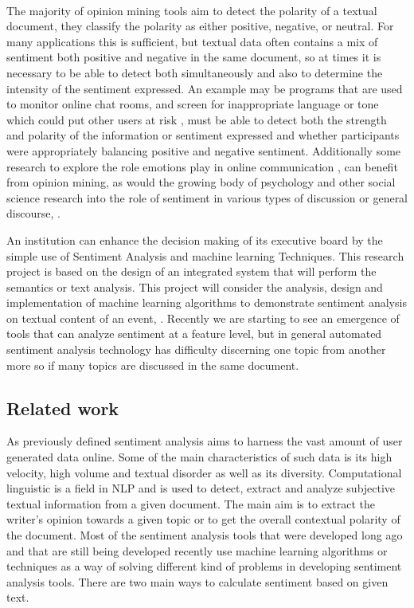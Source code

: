 \leavevmode\\
The majority of opinion mining tools aim to detect the polarity of a textual document, they classify the polarity as either positive, negative, or neutral. For many applications this is sufficient, but textual data often contains a mix of sentiment both positive and negative in the same document, so at times it is necessary to be able to detect both simultaneously and also to determine the intensity of the sentiment expressed. An example may be programs that are used to monitor online chat rooms, and screen for inappropriate language or tone which could put other users at risk \cite{ref16}, must be able to detect both the strength and polarity of the information or sentiment expressed and whether participants were appropriately balancing positive and negative sentiment. Additionally some research to explore the role emotions play in online communication \cite{ref17}, can benefit from opinion mining, as would the growing body of psychology and other social science research into the role of sentiment in various types of discussion or general discourse, \cite{ref18}.

\clearpage
An institution can enhance the decision making of its executive board by the simple use of Sentiment Analysis and machine learning Techniques. This research project is based on the design of an integrated system that will perform the semantics or text analysis. This project will consider the analysis, design and implementation of machine learning algorithms to demonstrate sentiment analysis on textual content of an event, \cite{ref19}.
Recently we are starting to see an emergence of tools that can analyze sentiment at a feature level, but in general automated sentiment analysis technology has difficulty discerning one topic from another more so if many topics are discussed in the same document.
\leavevmode\\

\clearpage
\subsection{Related work}
As previously defined sentiment analysis aims to harness the vast amount of user generated data online. 
Some of the main characteristics of such data is its high velocity, high volume and textual disorder as well as its diversity. 
Computational linguistic is a field in NLP and is used to detect, extract and analyze subjective textual information from a given document. 
The main aim is to extract the writer's opinion towards a given topic or to get the overall contextual polarity of the document.
Most of the sentiment analysis tools that were developed long ago and that are still being developed
recently use machine learning algorithms or techniques as a way of solving different kind of
problems in developing sentiment analysis tools. There are two main ways to calculate sentiment
based on given text.


